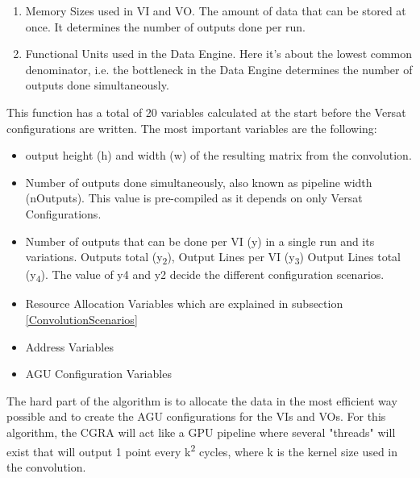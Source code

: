 \begin{enumerate}
	\item Memory Sizes used in VI and VO. The amount of data that can be stored at once. It determines the number of outputs done per run.
	\item Functional Units used in the Data Engine. Here it's about the lowest common denominator, i.e. the bottleneck in the Data Engine determines the number of outputs done simultaneously.
  \end{enumerate}
 
This function has a total of 20 variables calculated at the start before the Versat configurations are written. The most important
variables are the following:

\begin{itemize}
	\item output height (h) and width (w) of the resulting matrix from the convolution.
	\item Number of outputs done simultaneously, also known as pipeline width (nOutputs). This value is pre-compiled as it depends on only Versat Configurations.
	\item Number of outputs that can be done per VI (y) in a single run and its variations. Outputs total (y\textsubscript{2}), Output Lines per VI (y\textsubscript{3}) Output Lines total (y\textsubscript{4}).
The value of y4 and y2 decide the different configuration scenarios.
	\item Resource Allocation Variables
which are explained in subsection \ref*{ConvolutionScenarios}
	\item Address Variables
	\item AGU Configuration Variables
  \end{itemize}

The hard part of the algorithm is to allocate the data in the most efficient way possible and to create the AGU configurations
for the VIs and VOs. For this algorithm, the CGRA will act like a GPU pipeline where several "threads" will exist
that will output 1 point every k\textsuperscript{2} cycles, where k is the kernel size used in the convolution.

